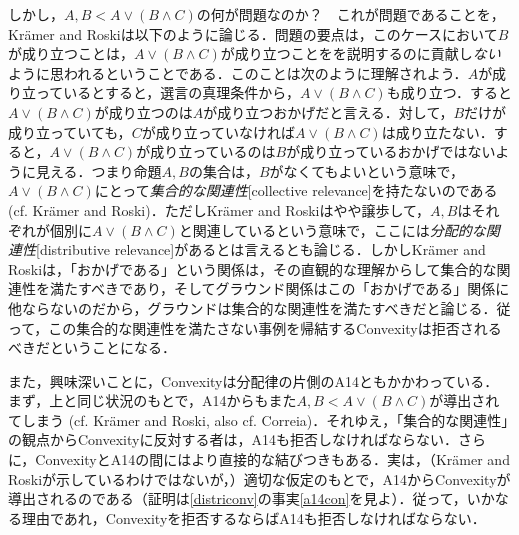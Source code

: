 \documentclass[twoside,14Q,dvipdfmx]{jsarticle}
\theoremstyle{definition}
\begin{document}
しかし，$A, B<A\lor(B\land C)$の何が問題なのか？　これが問題であることを，Kr\"{a}mer and Roski\cite{KramerandRoski2015}は以下のように論じる．問題の要点は，このケースにおいて$B$が成り立つことは，$A\lor(B\land C)$が成り立つことをを説明するのに貢献し\emph{ない}ように思われるということである．このことは次のように理解されよう．$A$が成り立っているとすると，選言の真理条件から，$A\lor(B\land C)$も成り立つ．すると$A\lor(B\land C)$が成り立つのは$A$が成り立つおかげだと言える．対して，$B$だけが成り立っていても，$C$が成り立っていなければ$A\lor(B\land C)$は成り立たない．すると，$A\lor(B\land C)$が成り立っているのは$B$が成り立っているおかげではないように見える．つまり命題$A, B$の集合は，$B$がなくてもよいという意味で，$A\lor(B\land C)$にとって\emph{集合的な関連性}[collective relevance]を持たないのである (cf. Kr\"{a}mer and Roski\cite[p.65]{KramerandRoski2015})．ただしKr\"{a}mer and Roskiはやや譲歩して，$A, B$はそれぞれが個別に$A\lor(B\land C)$と関連しているという意味で，ここには\emph{分配的な関連性}[distributive relevance]があるとは言えるとも論じる．しかしKr\"{a}mer and Roskiは，「おかげである」という関係は，その直観的な理解からして集合的な関連性を満たすべきであり，そしてグラウンド関係はこの「おかげである」関係に他ならないのだから，グラウンドは集合的な関連性を満たすべきだと論じる．従って，この集合的な関連性を満たさない事例を帰結するConvexityは拒否されるべきだということになる．

また，興味深いことに，Convexityは分配律の片側のA14ともかかわっている．まず，上と同じ状況のもとで，A14からもまた$A, B<A\lor(B\land C)$が導出されてしまう (cf. Kr\"{a}mer and Roski\cite[pp.62--3]{KramerandRoski2015}, also cf. Correia\cite[pp.119-20]{Correia2016})．それゆえ，「集合的な関連性」の観点からConvexityに反対する者は，A14も拒否しなければならない．さらに，ConvexityとA14の間にはより直接的な結びつきもある．実は，（Kr\"{a}mer and Roski\cite{KramerandRoski2015}が示しているわけではないが，）適切な仮定のもとで，A14からConvexityが導出されるのである（証明は\ref{districonv}の事実\ref{a14con}を見よ）．従って，いかなる理由であれ，Convexityを拒否するならばA14も拒否しなければならない．
\end{document}
